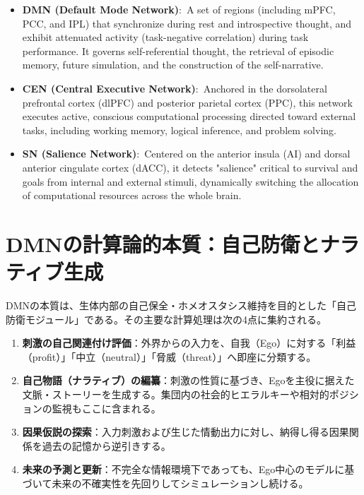     \begin{itemize}
        \item \textbf{DMN (Default Mode Network)}:\
            A set of regions (including mPFC, PCC, and IPL) that synchronize during rest and introspective thought, and exhibit attenuated activity (task-negative correlation) during task performance. It governs self-referential thought, the retrieval of episodic memory, future simulation, and the construction of the self-narrative.
        \item \textbf{CEN (Central Executive Network)}:\
            Anchored in the dorsolateral prefrontal cortex (dlPFC) and posterior parietal cortex (PPC), this network executes active, conscious computational processing directed toward external tasks, including working memory, logical inference, and problem solving.
        \item \textbf{SN (Salience Network)}:\
            Centered on the anterior insula (AI) and dorsal anterior cingulate cortex (dACC), it detects "salience" critical to survival and goals from internal and external stimuli, dynamically switching the allocation of computational resources across the whole brain.
    \end{itemize}
\fi

\ifja
    \section{DMNの計算論的本質：自己防衛とナラティブ生成}
    \label{section:DMNの働き}

    DMNの本質は、生体内部の自己保全・ホメオスタシス維持を目的とした「自己防衛モジュール」である。その主要な計算処理は次の4点に集約される。

    \begin{enumerate}[label=(\arabic*)]
        \item \textbf{刺激の自己関連付け評価}：外界からの入力を、自我（Ego）に対する「利益（profit）」「中立（neutral）」「脅威（threat）」へ即座に分類する。
        \item \textbf{自己物語（ナラティブ）の編纂}：刺激の性質に基づき、Egoを主役に据えた文脈・ストーリーを生成する。集団内の社会的ヒエラルキーや相対的ポジションの監視もここに含まれる。
        \item \textbf{因果仮説の探索}：入力刺激および生じた情動出力に対し、納得し得る因果関係を過去の記憶から逆引きする。
        \item \textbf{未来の予測と更新}：不完全な情報環境下であっても、Ego中心のモデルに基づいて未来の不確実性を先回りしてシミュレーションし続ける。
    \end{enumerate}

